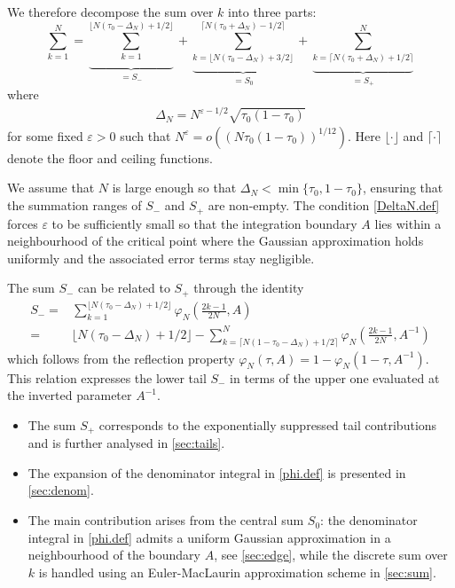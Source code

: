 \documentclass[pdflatex,sn-mathphys-num]{sn-jnl}
\theoremstyle{thmstyleone}
\numberwithin{equation}{section}
\begin{document}
We therefore decompose the sum over $k$ into three parts:
\begin{equation}
    \sum_{k=1}^N=\underbrace{\sum_{k=1}^{\lfloor N(\tau_0-\Delta_N)+1/2\rfloor}}_{=S_-}+\underbrace{\sum_{k=\lfloor N(\tau_0-\Delta_N)+3/2\rfloor}^{\lceil N(\tau_0+\Delta_N)-1/2\rceil}}_{=S_0}+\underbrace{\sum_{k=\lceil N(\tau_0+\Delta_N)+1/2\rceil}^{N}}_{=S_+}
\end{equation}
where
\begin{align}\label{DeltaN.def}
 \Delta_N=N^{\varepsilon-1/2}\sqrt{\tau_0(1-\tau_0)}
\end{align}
for some fixed $\varepsilon>0$ such that $N^\varepsilon=o\left(\left(N\tau_0(1-\tau_0)\right)^{1/12}\right)$. Here $\lfloor \cdot\rfloor$ and $\lceil \cdot\rceil$ denote the floor and ceiling functions.


We assume that $N$ is large enough so that $\Delta_N<\min\{\tau_0,1-\tau_0\}$, ensuring that the summation ranges of $S_-$ and $S_+$ are non-empty. The condition \eqref{DeltaN.def} forces $\varepsilon$ to be sufficiently small so that the integration boundary $A$ lies within a neighbourhood of the critical point where the Gaussian approximation holds uniformly and the associated error terms stay negligible.

The sum $S_-$ can be related to $S_+$ through the identity
\begin{equation}\label{sum.trick}
\begin{split}
S_-=&\sum_{k=1}^{\lfloor N(\tau_0-\Delta_N)+1/2\rfloor}\varphi_{N}\left(\frac{2k-1}{2N},A\right)\\
=&\lfloor N(\tau_0-\Delta_N)+1/2\rfloor-\sum_{k=\lceil N(1-\tau_0-\Delta_N)+1/2\rceil}^N\varphi_{N}\left(\frac{2k-1}{2N},A^{-1}\right)
\end{split}
\end{equation}
which follows from the reflection property $\varphi_{N}(\tau,A)=1-\varphi_{N}(1-\tau,A^{-1})$. This relation expresses the lower tail $S_{-}$ in terms of the upper one evaluated at the inverted parameter $A^{-1}$.

\begin{itemize}
    \item The sum $S_+$ corresponds to the exponentially suppressed tail contributions and is further analysed in \autoref{sec:tails}.
    \item The expansion of the denominator integral in \eqref{phi.def} is presented in \autoref{sec:denom}.
    \item The main contribution arises from the central sum $S_{0}$: the denominator integral in \eqref{phi.def} admits a uniform Gaussian approximation in a neighbourhood of the boundary $A$, see \autoref{sec:edge}, while the discrete sum over $k$ is handled using an Euler-MacLaurin approximation scheme in \autoref{sec:sum}.
\end{itemize}
\end{document}
